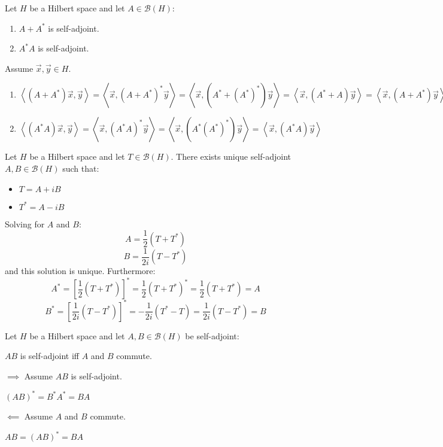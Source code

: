 \documentclass[letterpaper,12pt,fleqn]{article}
\newcommand{\mb}{\mathcal{B}}
\newcommand{\inner}[1]{\left<#1\right>}
\newcommand{\vx}{\vec{x}}
\newcommand{\vy}{\vec{y}}
\begin{document}
\begin{theorem}
  Let $H$ be a Hilbert space and let $A\in\mb(H)$:
  \begin{enumerate}
  \item $A+A^*$ is self-adjoint.
  \item $A^*A$ is self-adjoint.
  \end{enumerate}
\end{theorem}

\begin{theproof}
  Assume $\vx,\vy\in H$.
  \begin{enumerate}
  \item $\inner{(A+A^*)\vx,\vy}=\inner{\vx,(A+A^*)^*\vy}=
    \inner{\vx,(A^*+(A^*)^*)\vy}=\inner{\vx,(A^*+A)\vy}=
    \inner{\vx,(A+A^*)\vy}$

  \item $\inner{(A^*A)\vx,\vy}=\inner{\vx,(A^*A)^*\vy}=
    \inner{\vx,(A^*(A^*)^*)\vy}=\inner{\vx,(A^*A)\vy}$
  \end{enumerate}
\end{theproof}

\begin{theorem}
  Let $H$ be a Hilbert space and let $T\in\mb(H)$. There exists unique
  self-adjoint $A,B\in\mb(H)$ such that:
  \begin{itemize}
  \item $T=A+iB$
  \item $T^*=A-iB$
  \end{itemize}
\end{theorem}

\begin{theproof}
  Solving for $A$ and $B$:
  \[A=\frac{1}{2}(T+T^*)\]
  \[B=\frac{1}{2i}(T-T^*)\]
  and this solution is unique. Furthermore:
  \[A^*=\left[\frac{1}{2}(T+T^*)\right]^*=\frac{1}{2}(T+T^*)^*=
  \frac{1}{2}(T+T^*)=A\]
  \[B^*=\left[\frac{1}{2i}(T-T^*)\right]^*=-\frac{1}{2i}(T^*-T)=
  \frac{1}{2i}(T-T^*)=B\]
\end{theproof}

\begin{theorem}
  Let $H$ be a Hilbert space and let $A,B\in\mb(H)$ be self-adjoint:

  \qquad$AB$ is self-adjoint iff $A$ and $B$ commute.
\end{theorem}

\begin{theproof}
  \listbreak
  \begin{description}
  \item $\implies$ Assume $AB$ is self-adjoint.

    $(AB)^*=B^*A^*=BA$

  \item $\impliedby$ Assume $A$ and $B$ commute.

    $AB=(AB)^*=BA$
  \end{description}
\end{theproof}
\end{document}
